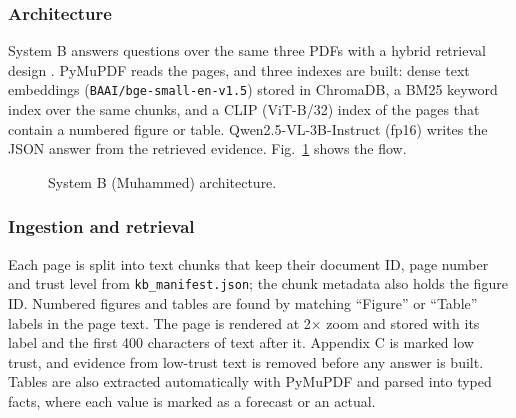 \subsubsection{Architecture}
System B answers questions over the same three PDFs with a hybrid retrieval design \cite{lewis}. PyMuPDF reads the pages, and three indexes are built: dense text embeddings (\texttt{BAAI/bge-small-en-v1.5}) stored in ChromaDB, a BM25 keyword index over the same chunks, and a CLIP (ViT-B/32) index of the pages that contain a numbered figure or table. Qwen2.5-VL-3B-Instruct (fp16) writes the JSON answer from the retrieved evidence. Fig.~\ref{fig:p1m} shows the flow.
\begin{figure}[!t]
\centering
{}
\caption{System B (Muhammed) architecture.}
\label{fig:p1m}
\end{figure}

\subsubsection{Ingestion and retrieval}
Each page is split into text chunks that keep their document ID, page number and trust level from \texttt{kb\_manifest.json}; the chunk metadata also holds the figure ID. Numbered figures and tables are found by matching ``Figure'' or ``Table'' labels in the page text. The page is rendered at 2$\times$ zoom and stored with its label and the first 400 characters of text after it. Appendix C is marked low trust, and evidence from low-trust text is removed before any answer is built. Tables are also extracted automatically with PyMuPDF and parsed into typed facts, where each value is marked as a forecast or an actual.

